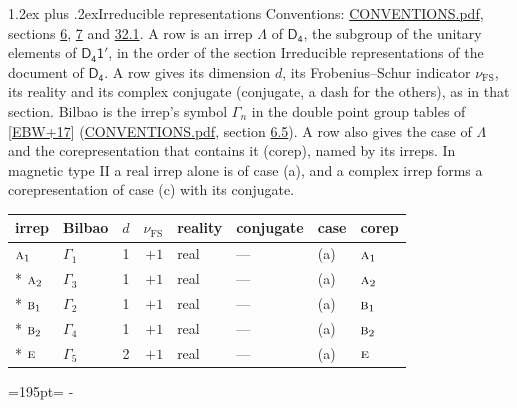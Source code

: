 \documentclass[10pt,a4paper]{article}
\makeatletter
\renewcommand\section{\@startsection{section}{1}{\z@}{-3ex plus -1ex minus -.2ex}%
  {1.2ex plus .2ex}{\normalfont\large\sffamily\bfseries\color{parttitle}}}
\newcommand{\needspace}[1]{\par\penalty-100\begingroup\dimen0=#1\relax\dimen2=\pagegoal
  \advance\dimen2-\pagetotal\ifdim\dimen0>\dimen2\relax\ifdim\dimen2>0pt\vfil\break\fi\fi
  \endgroup}
\numberwithin{equation}{section}
\newcommand{\grp}[1]{\mathsf{#1}}
\newcommand{\irr}[1]{\text{\normalfont\scshape #1}}
\newcommand{\fsind}{\nu_{\mathrm{FS}}}
\makeatother
\begin{document}
\section{Irreducible representations}\label{s:irreps}
Conventions: \href{../../CONVENTIONS.pdf}{CONVENTIONS.pdf}, sections \href{../../../rotation/CONVENTIONS.pdf\#conv.6}{6}, \href{../../../rotation/CONVENTIONS.pdf\#conv.7}{7} and \href{../../CONVENTIONS.pdf\#conv.32.1}{32.1}.
\leavevmode\label{n:irrep.Delta}A row is an irrep $\Lambda$ of $\grp{D_{4}}$, the subgroup of the unitary elements of $\grp{D_{4}1'}$, in the order of the section Irreducible representations of the document of \href{../../../rotation/data/pdf/D4.pdf}{$\grp{D_{4}}$}. \label{n:index.dimension}\label{n:index.frobenius}\label{n:head.irrep}\label{n:head.reality}\label{n:head.conjugate}A row gives its dimension $d$, its Frobenius--Schur indicator $\fsind$, its reality and its complex conjugate (conjugate, a dash for the others), as in that section. \label{n:head.bilbao}\label{n:irrep.alias.gamma}Bilbao is the irrep's symbol $\Gamma_n$ in the double point group tables of [\href{../../../REFERENCES.pdf\#ref.EBW+17}{EBW+17}] (\href{../../CONVENTIONS.pdf}{CONVENTIONS.pdf}, section \href{../../../rotation/CONVENTIONS.pdf\#conv.6.5}{6.5}). \label{n:head.case.corep}\label{n:head.corep}A row also gives the case of $\Lambda$ and the corepresentation that contains it (corep), named by its irreps. In magnetic type II a real irrep alone is of case (a), and a complex irrep forms a corepresentation of case (c) with its conjugate.
\setlength{\emergencystretch}{2em}\par\setlength{\emergencystretch}{0pt}
{\small\renewcommand{\arraystretch}{1.25}\setlength{\tabcolsep}{4pt}\begin{longtable}{@{}llrrllll@{}}\toprule
irrep & Bilbao & $d$ & $\fsind$ & reality & conjugate & case & corep\\\midrule\endhead
\bottomrule\endfoot\endlastfoot
$\irr{a}_{1}$ & $\Gamma_{1}$ & 1 & $+1$ & real & --- & (a) & $\irr{a}_{1}$\\*
$\irr{a}_{2}$ & $\Gamma_{3}$ & 1 & $+1$ & real & --- & (a) & $\irr{a}_{2}$\\*
$\irr{b}_{1}$ & $\Gamma_{2}$ & 1 & $+1$ & real & --- & (a) & $\irr{b}_{1}$\\*
$\irr{b}_{2}$ & $\Gamma_{4}$ & 1 & $+1$ & real & --- & (a) & $\irr{b}_{2}$\\*
$\irr{e}$ & $\Gamma_{5}$ & 2 & $+1$ & real & --- & (a) & $\irr{e}$\\
\bottomrule\end{longtable}}
\needspace{195pt}
\end{document}
